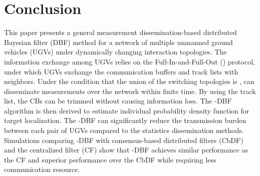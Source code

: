 \section{Conclusion}\label{sec:conclu}	
	This paper presents a general measurement dissemination-based distributed Bayesian filter (DBF) method for a network of multiple unmanned ground vehicles (UGVs) under dynamically changing interaction topologies.
	The information exchange among UGVs relies on the Full-In-and-Full-Out (\proto) protocol, under which UGVs exchange the communication buffers and track lists with neighbors.
	Under the condition that the union of the switching topologies is \fc, {\proto} can disseminate measurements over the network within finite time. 
	By using the track list, the CBs can be trimmed without causing information loss.
	The \proto-DBF algorithm is then derived to estimate individual probability density function for target localization. 	
	The \proto-DBF can significantly reduce the transmission burden between each pair of UGVs compared to the statistics dissemination methods. %
	Simulations comparing \proto-DBF with consensus-based distributed filters (CbDF) and the centralized filter (CF) show that \proto-DBF achieves similar performance as the CF and superior performance over the CbDF while requiring less communication resource.
	
